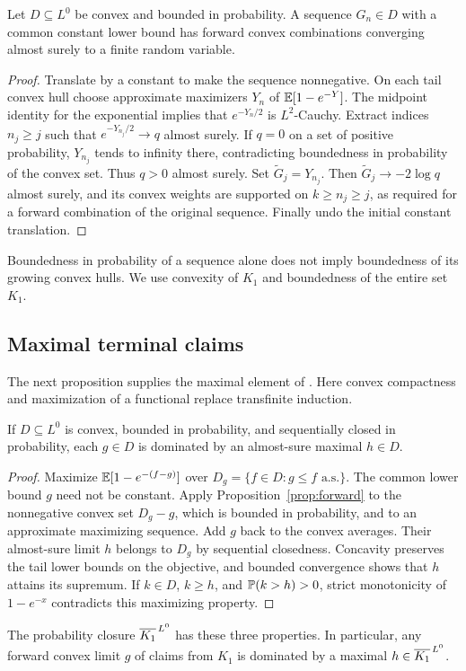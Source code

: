 \begin{proposition}\label{prop:forward}
Let $D\subseteq L^0$ be convex and bounded in probability. A sequence $G_n\in D$
with a common constant lower bound has forward convex combinations converging
almost surely to a finite random variable.
\end{proposition}
\begin{proof}
Translate by a constant to make the sequence nonnegative. On each tail convex
hull choose approximate maximizers $Y_n$ of $\mathbb E[1-e^{-Y}]$.
The midpoint identity for the exponential implies that $e^{-Y_n/2}$ is
$L^2$-Cauchy. Extract indices $n_j\geq j$ such that
$e^{-Y_{n_j}/2}\to q$ almost surely. If $q=0$ on a set of positive probability,
$Y_{n_j}$ tends to infinity there, contradicting boundedness in probability
of the convex set. Thus $q>0$ almost surely. Set $\widetilde G_j=Y_{n_j}$.
Then $\widetilde G_j\to-2\log q$ almost surely, and its convex weights
are supported on $k\geq n_j\geq j$, as required for a forward combination
of the original sequence. Finally undo the initial constant translation.
\end{proof}
Boundedness in probability of a sequence alone does not imply boundedness of
its growing convex hulls. We use convexity of $K_1$ and boundedness of the
entire set $K_1$.

\subsection{Maximal terminal claims}
The next proposition supplies the maximal element of \cite[Lemma 4.3]{DS}. Here convex compactness and maximization of a functional replace transfinite induction.

\begin{proposition}\label{prop:maximal}
If $D\subseteq L^0$ is convex, bounded in probability, and sequentially closed
in probability, each $g\in D$ is dominated by an almost-sure maximal $h\in D$.
\end{proposition}
\begin{proof}
Maximize $\mathbb E[1-e^{-(f-g)}]$ over $D_g=\{f\in D:g\leq f\text{ a.s.}\}$.
The common lower bound $g$ need not be constant. Apply
Proposition~\ref{prop:forward} to the nonnegative convex set $D_g-g$, which is
bounded in probability, and to an approximate maximizing sequence.
Add $g$ back to the convex averages. Their almost-sure limit $h$ belongs to
$D_g$ by sequential closedness. Concavity preserves the tail lower bounds on
the objective, and bounded convergence shows that $h$ attains its supremum.
If $k\in D$, $k\geq h$, and $\mathbb P(k>h)>0$, strict monotonicity of $1-e^{-x}$
contradicts this maximizing property.
\end{proof}
The probability closure $\overline{K_1}^{\,L^0}$ has these three properties.
In particular, any forward convex limit $g$ of claims from $K_1$ is dominated
by a maximal $h\in\overline{K_1}^{\,L^0}$.
